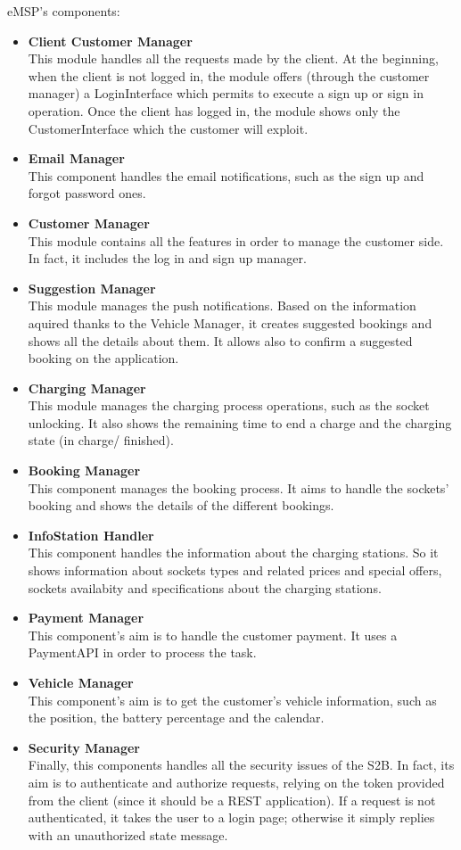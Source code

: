 eMSP's components:
\begin{itemize}
    \item \textbf{Client Customer Manager}\\This module handles all the requests made by the client. At the beginning, when the client is not logged in, the module offers (through the customer manager) a LoginInterface which permits to execute a sign up or sign in operation. Once the client has logged in, the module shows only the CustomerInterface which the customer will exploit.
    \item \textbf{Email Manager}\\This component handles the email notifications, such as the sign up and forgot password ones.
    \item \textbf{Customer Manager}\\This module contains all the features in order to manage the customer side. In fact, it includes the log in and sign up manager.
    
    \item \textbf{Suggestion Manager}\\This module manages the push notifications. Based on the information aquired thanks to the Vehicle Manager, it creates suggested bookings and shows all the details about them. It allows also to confirm a suggested booking on the application.
    \item \textbf{Charging Manager}\\ This module manages the charging process operations, such as the socket unlocking. It also shows the remaining time to end a charge and the charging state (in charge/ finished).
    \item \textbf{Booking Manager}\\This component manages the booking process. It aims to handle the sockets' booking and shows the details of the different bookings.
    \item \textbf{InfoStation Handler}\\This component handles the information about the charging stations. So it shows information about sockets types and related prices and special offers, sockets availabity and specifications about the charging stations.
    \item \textbf{Payment Manager}\\This component's aim is to handle the customer payment. It uses a PaymentAPI in order to process the task.
    \item \textbf{Vehicle Manager}\\This component's aim is to get the customer's vehicle information, such as the position, the battery percentage and the calendar.
    \item \textbf{Security Manager}\\Finally, this components handles all the security issues of the S2B. In fact, its aim is to authenticate and authorize requests, relying on the token provided from the client (since it should be a REST application). If a request is not authenticated, it takes the user to a login page; otherwise it simply replies with an unauthorized state message.
\end{itemize}

